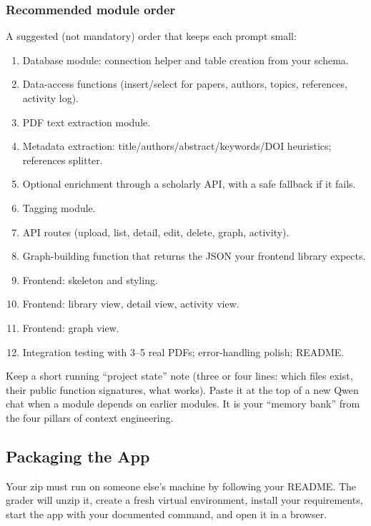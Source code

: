 \documentclass[11pt,a4paper]{article}
\newcommand{\fn}[1]{\texttt{\detokenize{#1}}}
\begin{document}
\subsubsection{Recommended module order}
A suggested (not mandatory) order that keeps each prompt small:
\begin{enumerate}
\item Database module: connection helper and table creation from your schema.
\item Data-access functions (insert/select for papers, authors, topics, references, activity log).
\item PDF text extraction module.
\item Metadata extraction: title/authors/abstract/keywords/DOI heuristics; references splitter.
\item Optional enrichment through a scholarly API, with a safe fallback if it fails.
\item Tagging module.
\item API routes (upload, list, detail, edit, delete, graph, activity).
\item Graph-building function that returns the JSON your frontend library expects.
\item Frontend: \fn{index.html} skeleton and styling.
\item Frontend: library view, detail view, activity view.
\item Frontend: graph view.
\item Integration testing with 3--5 real PDFs; error-handling polish; README.
\end{enumerate}

\begin{tipbox}
Keep a short running ``project state'' note (three or four lines: which files exist, their public function signatures, what works). Paste it at the top of a new Qwen chat when a module depends on earlier modules. It is your ``memory bank'' from the four pillars of context engineering.
\end{tipbox}

\subsection{Packaging the App}
Your zip must run on someone else's machine by following your README. The grader will unzip it, create a fresh virtual environment, install your requirements, start the app with your documented command, and open it in a browser.
\end{document}
